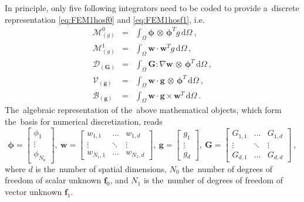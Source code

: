 \documentclass[review]{elsarticle}
\newcommand{\vect}[1]{\boldsymbol{#1}}
\newcommand{\matr}[1]{\mathbf{#1}}
\newcommand{\dI}{\text{d}}
\newcommand{\vfzero}{\vect{f}_0}
\newcommand{\fone}{\vect{f}_1}
\newcommand{\intO}{\int_{\Omega}}
\newcommand{\IM}{\boldsymbol{\mathcal{M}}}
\newcommand{\ID}{\boldsymbol{\mathcal{D}}}
\newcommand{\IV}{\boldsymbol{\mathcal{V}}}
\newcommand{\IB}{\boldsymbol{\mathcal{B}}}
\begin{document}
In principle, only five following integrators need to be coded to provide
a~discrete representation \eqref{eq:FEM1hosf0} and \eqref{eq:FEM1hosf1}, i.e.
\begin{eqnarray}
  \IM^0_{(g)} &=& \intO\vect{\phi}\, \otimes\, \vect{\phi}^T g\, \dI \Omega~,
  \label{eq:IM0}\\
  \IM^1_{(g)} &=& \intO\matr{w} \cdot \matr{w}^T g\, \dI\Omega~,
  \label{eq:IM1}\\
  \ID_{(\matr{G})} &=& \intO \matr{G} : \nabla\matr{w}
  \, \otimes\, \vect{\phi}^T\, \dI \Omega~,
  \label{eq:ID}\\
  \IV_{(\vect{g})} &=& \intO\matr{w} \cdot
  \vect{g}\, \otimes\, \vect{\phi}^T\, \dI \Omega~,
  \label{eq:IV}\\
  \IB_{(\vect{g})} &=& \intO\matr{w} \cdot
  \vect{g} \times \matr{w}^T\, \dI \Omega~.
  \label{eq:IB}
\end{eqnarray}
The~algebraic representation of the~above mathematical objects, which
form the~basis for numerical discretization, reads 
\begin{equation}
  \vect{\phi} = \begin{bmatrix}
    \phi_{1} \\
	\vdots   \\
	\phi_{N_0}
  \end{bmatrix},~
  \matr{w} = \begin{bmatrix}
    w_{1, 1} & \hdots & w_{1, d} \\
	\vdots   & \ddots & \vdots \\
	w_{N_1, 1} & \hdots & w_{N_1, d}
  \end{bmatrix},~
  \vect{g} = \begin{bmatrix}
    g_{1} \\
	\vdots   \\
	g_{d}
  \end{bmatrix},~
  \matr{G} = \begin{bmatrix}
    G_{1, 1} & \hdots & G_{1, d} \\
	\vdots   & \ddots & \vdots \\
	G_{d, 1} & \hdots & G_{d, d}
  \end{bmatrix}~,
\end{equation}
where $d$ is the~number of spatial dimensions, $N_0$ the~number of
degrees of freedom of scalar unknown $\vfzero$, and $N_1$ is the~number
of degrees of freedom of vector unknown $\fone$.
\end{document}
